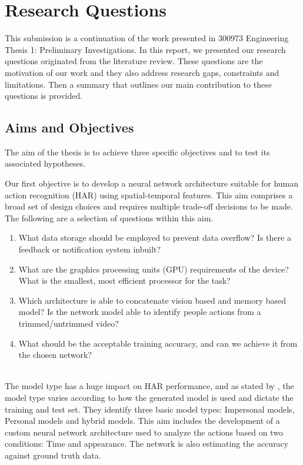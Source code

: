 
\chapter{Research Questions} %

\label{Chapter1} %
This submission is a continuation of the work presented in 300973 Engineering Thesis 1: Preliminary Investigations. In this report, we presented our research questions originated from the literature review. These questions are the motivation of our work and they also address research gaps, constraints and limitations. Then a summary that outlines our main contribution to these questions is provided.

\newcommand{\keyword}[1]{\textbf{#1}}
\newcommand{\tabhead}[1]{\textbf{#1}}
\newcommand{\code}[1]{\texttt{#1}}
\newcommand{\file}[1]{\texttt{\bfseries#1}}
\newcommand{\option}[1]{\texttt{\itshape#1}}

\section{Aims and Objectives}
The aim of the thesis is to achieve three specific objectives and to test its associated hypotheses.


Our first objective is to develop a neural network architecture suitable for human action recognition (HAR) using spatial-temporal features. This aim comprises a broad set of design choices and requires multiple trade-off decisions to be made. The following are a selection of questions within this aim.
\begin{enumerate}
    \item What data storage should be employed to prevent data overflow? Is there a feedback or notification system inbuilt?
    \item What are the graphics processing units (GPU) requirements of the device? What is the smallest, most efficient processor for the task?
    \item Which architecture is able to concatenate vision based and memory based model? Is the network model able to identify people actions from a trimmed/untrimmed video?  
    \item What should be the acceptable training accuracy, and can we achieve it from the chosen network?
\end{enumerate}\\
The model type has a huge impact on HAR performance, and as stated by \cite{lockhart2014limitations}, the model type varies according to how the generated model is used and dictate the training and test set. They identify three basic model types: Impersonal models, Personal models and hybrid models. This aim includes the development of a custom neural network architecture used to analyze the actions based on two conditions: Time and appearance. The network is also estimating the accuracy against ground truth data.\\  

